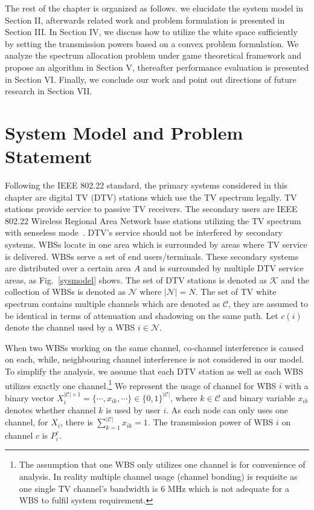 The rest of the chapter is organized as follows. we elucidate the system model in Section II, afterwards related work and problem formulation is presented in Section III. In Section IV, we discuss how to utilize the white space sufficiently by setting the transmission powers based on a convex problem formulation. We analyze the spectrum allocation problem under game theoretical framework and propose an algorithm in Section V, thereafter performance evaluation is presented in Section VI. Finally, we conclude our work and point out directions of future research in Section VII.


\section{System Model and Problem Statement}
\label{SystemModel}
Following the IEEE 802.22 standard, the primary systems considered in this chapter are digital TV (\gls{DTV}) stations which use the TV spectrum legally. 
TV stations provide service to passive TV receivers.
The secondary users are IEEE 802.22 Wireless Regional Area Network base stations utilizing the TV spectrum with senseless mode~\cite{SenseLess2011}. 
DTV's service should not be interfered by secondary systems. 
WBSs locate in one area which is surrounded by areas where TV service is delivered.
WBSs serve a set of end users/terminals.
These secondary systems are distributed over a certain area $A$ and is surrounded by multiple DTV service areas, as Fig.~\ref{sysmodel} shows. 
The set of DTV stations is denoted as $\mathcal{K}$ and the collection of WBSs is denoted as $\mathcal{N}$ where $|\mathcal{N}|=N$. 
The set of TV white spectrum contains multiple channels which are denoted as $\mathcal{C}$, they are assumed to be identical in terms of attenuation and shadowing on the same path.
Let $c(i)$ denote the channel used by a WBS $i\in \mathcal{N}$.

When two WBSs working on the same channel, co-channel interference is caused on each, while, neighbouring channel interference is not considered in our model. 
To simplify the analysis, we assume that each DTV station as well as each WBS utilizes exactly one channel.\footnote{The assumption that one WBS only utilizes one channel is for convenience of analysis. In reality multiple channel usage (channel bonding) is requisite as one single TV channel's bandwidth is 6 MHz which is not adequate for a WBS to fulfil system requirement. 
}
We represent the usage of channel for WBS $i$ with a binary vector $X_i^{|\mathcal{C}|\times 1}=\{\cdots, x_{ik}, \cdots\}\in \{0,1\}^{|\mathcal{C}|}$, where $k\in \mathcal{C}$ and binary variable $x_{ik}$ denotes whether channel $k$ is used by user $i$. 
As each node can only uses one channel, for $X_i$, there is $\sum_{k=1}^{|\mathcal{C}|}x_{ik}=1$. 
The transmission power of WBS $i$ on channel $c$ is $P_i^c$. 



